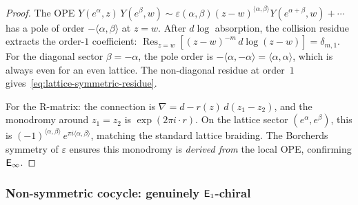 \begin{proof}
The OPE $Y(e^\alpha,z)\,Y(e^\beta,w) \sim
\varepsilon(\alpha,\beta)(z-w)^{\langle\alpha,\beta\rangle}
Y(e^{\alpha+\beta},w) + \cdots$ has a pole of order
$-\langle\alpha,\beta\rangle$ at $z = w$. After $d\log$ absorption,
the collision residue extracts the order-$1$ coefficient:
$\operatorname{Res}_{z=w}[(z-w)^{-m}\,d\log(z-w)] = \delta_{m,1}$.
For the diagonal sector $\beta = -\alpha$, the pole order is
$-\langle\alpha,-\alpha\rangle = \langle\alpha,\alpha\rangle$, which
is always even for an even lattice. The non-diagonal residue at
order~$1$ gives~\eqref{eq:lattice-symmetric-residue}.

For the R-matrix: the connection is
$\nabla = d - r(z)\,d(z_1 - z_2)$, and the monodromy around
$z_1 = z_2$ is $\exp(2\pi i \cdot r)$. On the lattice sector
$(e^\alpha, e^\beta)$, this is
$(-1)^{\langle\alpha,\beta\rangle}\,
e^{\pi i \langle\alpha,\beta\rangle}$, matching the standard
lattice braiding. The Borcherds symmetry of $\varepsilon$ ensures
this monodromy is \emph{derived from} the local OPE, confirming
$\mathsf{E}_{\infty}$.
\end{proof}

\subsubsection{Non-symmetric cocycle: genuinely \texorpdfstring{$\mathsf{E}_1$}{E1}-chiral}

